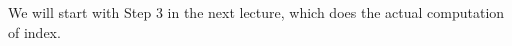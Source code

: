 		We will start with Step 3 in the next lecture, which does the actual computation of index.
		
		
		
		
		
	




% 

	
		
% 	